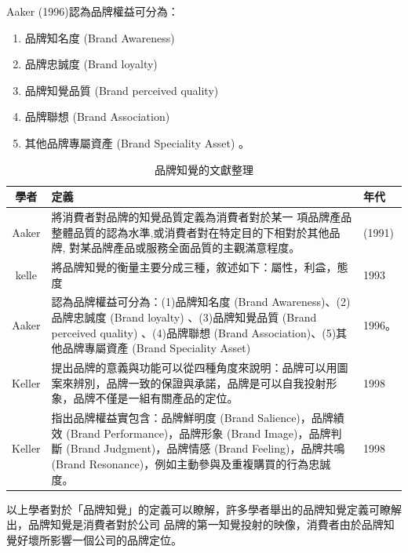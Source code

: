 Aaker (1996)認為品牌權益可分為\cite{Aaker1996}：
\begin{enumerate}
\item 品牌知名度 (Brand Awareness)
\item 品牌忠誠度 (Brand loyalty) 
\item 品牌知覺品質 (Brand perceived quality) 
\item 品牌聯想 (Brand Association)
\item 其他品牌專屬資產 (Brand Speciality Asset) 。
\end{enumerate}





\begin{table}[htb]
\caption{品牌知覺的文獻整理}
\label{tab:PL2}
\centering
%
\begin{tabular}[H]{|c|p{8.5cm}|p{2.5cm}|} %
\hline
學者&定義 & 年代 \tabularnewline
\hline
Aaker & 將消費者對品牌的知覺品質定義為消費者對於某一 項品牌產品整體品質的認為水準,或消費者對在特定目的下相對於其他品牌, 對某品牌產品或服務全面品質的主觀滿意程度。& (1991)  \tabularnewline
\hline
kelle&將品牌知覺的衡量主要分成三種，敘述如下：屬性，利益，態度& 1993 \tabularnewline
\hline
Aaker&認為品牌權益可分為：(1)品牌知名度 (Brand Awareness)、(2)品牌忠誠度 (Brand loyalty) 、(3)品牌知覺品質 (Brand perceived quality) 、(4)品牌聯想 (Brand Association)、(5)其他品牌專屬資產 (Brand Speciality Asset) &1996。\tabularnewline
\hline
Keller&提出品牌的意義與功能可以從四種角度來說明：品牌可以用圖案來辨別，品牌一致的保證與承諾，品牌是可以自我投射形象，品牌不僅是一組有關產品的定位。&1998 \tabularnewline
\hline
Keller&指出品牌權益實包含：品牌鮮明度 (Brand Salience)，品牌績效 (Brand Performance)，品牌形象 (Brand Image)，品牌判斷 (Brand Judgment)，品牌情感 (Brand Feeling)，品牌共鳴 (Brand Resonance)，例如主動參與及重複購買的行為忠誠度。&1998 \tabularnewline
\hline
\end{tabular}
\end{table}
以上學者對於「品牌知覺」的定義可以瞭解，許多學者舉出的品牌知覺定義可瞭解出，品牌知覺是消費者對於公司 品牌的第一知覺投射的映像，消費者由於品牌知覺好壞所影響一個公司的品牌定位。



